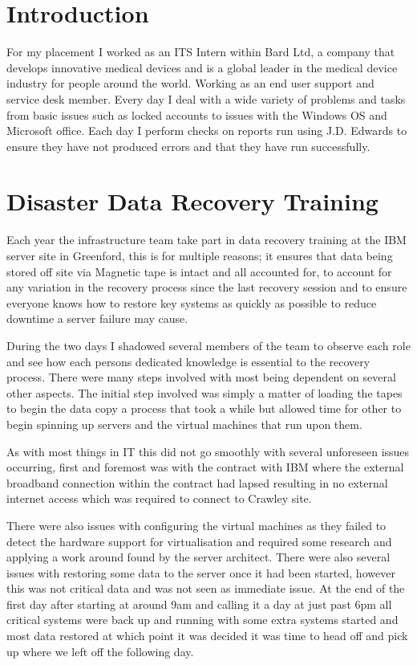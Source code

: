 \section{Introduction}\label{introduction}

For my placement I worked as an ITS Intern within Bard Ltd, a company
that develops innovative medical devices and is a global leader in the
medical device industry for people around the world. Working as an end
user support and service desk member. Every day I deal with a wide
variety of problems and tasks from basic issues such as locked accounts
to issues with the Windows OS and Microsoft office. Each day I perform
checks on reports run using J.D. Edwards to ensure they have not
produced errors and that they have run successfully.

\section{Disaster Data Recovery
Training}\label{disaster-data-recovery-training}

Each year the infrastructure team take part in data recovery training at
the IBM server site in Greenford, this is for multiple reasons; it
ensures that data being stored off site via Magnetic tape is intact and
all accounted for, to account for any variation in the recovery process
since the last recovery session and to ensure everyone knows how to
restore key systems as quickly as possible to reduce downtime a server
failure may cause.

During the two days I shadowed several members of the team to observe
each role and see how each persons dedicated knowledge is essential to
the recovery process. There were many steps involved with most being
dependent on several other aspects. The initial step involved was simply
a matter of loading the tapes to begin the data copy a process that took
a while but allowed time for other to begin spinning up servers and the
virtual machines that run upon them.

As with most things in IT this did not go smoothly with several
unforeseen issues occurring, first and foremost was with the contract
with IBM where the external broadband connection within the contract had
lapsed resulting in no external internet access which was required to
connect to Crawley site.

There were also issues with configuring the virtual machines as they
failed to detect the hardware support for virtualisation and required
some research and applying a work around found by the server architect.
There were also several issues with restoring some data to the server
once it had been started, however this was not critical data and was not
seen as immediate issue. At the end of the first day after starting at
around 9am and calling it a day at just past 6pm all critical systems
were back up and running with some extra systems started and most data
restored at which point it was decided it was time to head off and pick
up where we left off the following day.

